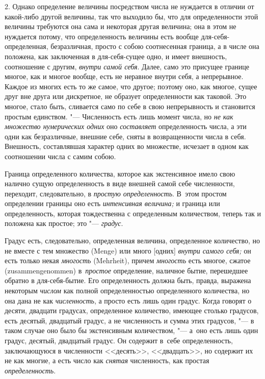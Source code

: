 2. Однако определение величины посредством числа не нуждается в отличии от
какой-либо другой величины, так что выходило бы, что для определенности этой
величины требуются она сама и некоторая другая величина; она в этом не
нуждается потому, что определенность величины есть вообще
для-себя-определенная, безразличная, просто с собою соотнесенная граница, а
в числе она положена, как заключенная в для-себя-сущее одно, и имеет внешность,
соотношение с другим, {\em внутри самой себя}. Далее, само это присущее границе
многое, как и многое вообще, есть не неравное внутри себя, а непрерывное.
Каждое из многих есть то же самое, что другое; поэтому оно, как многое, сущее
друг вне друга или дискретное, не образует определенности как таковой. Это
многое, стало быть, сливается само по себе в свою непрерывность и становится
простым единством. "--- Численность есть лишь момент числа, но {\em не как
множество нумерических одних} оно {\em составляет} определенность числа, а эти
одни как безразличные, внешние себе, сняты в возвращенности числа в себя.
Внешность, составлявшая характер одних во множестве, исчезает в одном как
соотношении числа с самим собою.

Граница определенного количества, которое как экстенсивное имело свою налично
сущую определенность в виде внешней самой себе численности, переходит,
следовательно, в {\em простую определенность}. В~этом простом определении
границы оно есть {\em интенсивная величина;} и граница или определенность,
которая тождественна с определенным количеством, теперь так и положена как
простое; это "--- {\em градус}.

Градус есть, следовательно, определенная величина, определенное количество, но
не вместе с тем множество (Menge) или много [одних] {\em внутри самого себя;}
он есть только некая {\em многость} (Mehrheit), причем {\em многость} есть
многое, сжатое (zusammengenommen) в~{\em простое} определение, наличное бытие,
перешедшее обратно в для-себя-бытие. Его определенность должна быть, правда,
выражена некоторым {\em числом} как полной определенностью определенного
количества, но она дана не как {\em численность}, а просто есть лишь один
градус. Когда говорят о десяти, двадцати градусах, определенное количество,
имеющее столько градусов, есть десятый, двадцатый градус, а не численность и
сумма этих градусов, "--- в таком случае оно было бы экстенсивным количеством,
"--- а~оно есть лишь один градус, десятый, двадцатый градус. Он содержит в~себе
определенность, заключающуюся в численности <<десять>>, <<двадцать>>, но
содержит их не как многие, а есть число как {\em снятая} численность, как
простая {\em определенность}.


